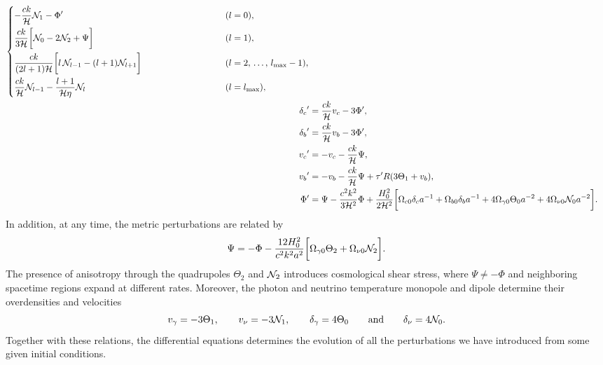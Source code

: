 \documentclass[10pt,a4paper]{article}
\begin{document}
\begin{subequations}
\begin{align}
\begin{dcases}
	                       -\frac{ck}{\aH} \N_1 - \Phi^\prime & (l=0), \\
	                       \frac{ck}{3\aH} \bigg[ \N_0 - 2 \N_2 + \Psi \bigg] & (l=1) , \\
	                       \frac{ck}{(2l+1)\aH} \bigg[ l \, \N_{l-1} - (l+1) \N_{l+1} \bigg] \phantom{ {} + \tau^\prime \bigg[ \Theta^P_l - \frac{\Pi}{10} \delta_{l,2} \bigg]} & (l=2,\, \ldots,\, l_\text{max}-1), \\
	                       \frac{ck}{\aH} \N_{l-1} - \frac{l+1}{\aH \eta} \N_l & (l=l_\text{max}),
	                       \end{dcases} \\
	{\delta_c}^\prime   &= \frac{ck}{\aH} v_c - 3 \Phi^\prime , \\
	{\delta_b}^\prime   &= \frac{ck}{\aH} v_b - 3 \Phi^\prime , \\
	{v_c}^\prime        &= -v_c - \frac{ck}{\aH} \Psi , \\
	{v_b}^\prime        &= -v_b - \frac{ck}{\aH} \Psi + \tau^\prime R (3\Theta_1 + v_b), \\
	{\Phi}^\prime       &= \Psi - \frac{c^2 k^2}{3 \aH^2} \Phi + \frac{H_0^2}{2 \aH^2} \bigg[ \Omega_{c0} \delta_c a^{-1} + \Omega_{b0} \delta_b a^{-1} + 4 \Omega_{\gamma 0} \Theta_0 a^{-2} + 4 \Omega_{\nu 0} \N_0 a^{-2} \bigg] .
\end{align}
\label{eq_perturb_full}
\end{subequations}
In addition, at any time, the metric perturbations are related by
\begin{equation}
	\Psi  = -\Phi - \frac{12 H_0^2}{c^2 k^2 a^2} \bigg[ \Omega_{\gamma 0} \Theta_2 + \Omega_{\nu 0} \mathcal{N}_2 \bigg] .
\label{eq_potential_relation}
\end{equation}
The presence of anisotropy through the quadrupoles $\Theta_2$ and $\mathcal{N}_2$ introduces cosmological shear stress,
where $\Psi \neq -\Phi$ and neighboring spacetime regions expand at different rates.
Moreover, the photon and neutrino temperature monopole and dipole determine their overdensities and velocities
\begin{equation}
	v_\gamma = -3\Theta_1, \qquad
	v_\nu = -3\mathcal{N}_1, \qquad
	\delta_\gamma = 4\Theta_0 \qquad \text{and} \qquad
	\delta_\nu = 4\mathcal{N}_0.
\label{eq_radiation_velocity_overdensity}
\end{equation}
Together with these relations, the differential equations determines the evolution of all the perturbations we have introduced from some given initial conditions.
\end{document}
